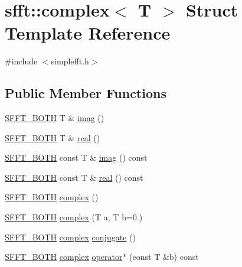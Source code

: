 \hypertarget{structsfft_1_1complex}{}\section{sfft\+:\+:complex$<$ T $>$ Struct Template Reference}
\label{structsfft_1_1complex}


{\ttfamily \#include $<$simplefft.\+h$>$}

\subsection*{Public Member Functions}
\begin{DoxyCompactItemize}
\item 
\hyperlink{simplefft_8h_acfebaca1d9d8f48864704773594876b7}{S\+F\+F\+T\+\_\+\+B\+O\+TH} T \& \hyperlink{structsfft_1_1complex_a5009deeeef4a74a8f75db6e78d832fcc}{imag} ()
\item 
\hyperlink{simplefft_8h_acfebaca1d9d8f48864704773594876b7}{S\+F\+F\+T\+\_\+\+B\+O\+TH} T \& \hyperlink{structsfft_1_1complex_ab7b8596da4ba20a31758a4c0a103d011}{real} ()
\item 
\hyperlink{simplefft_8h_acfebaca1d9d8f48864704773594876b7}{S\+F\+F\+T\+\_\+\+B\+O\+TH} const T \& \hyperlink{structsfft_1_1complex_a7902faacfb7ac78d69a9ce5859943e01}{imag} () const 
\item 
\hyperlink{simplefft_8h_acfebaca1d9d8f48864704773594876b7}{S\+F\+F\+T\+\_\+\+B\+O\+TH} const T \& \hyperlink{structsfft_1_1complex_a2a5ad98469d109a88b115419dab31ef6}{real} () const 
\item 
\hyperlink{simplefft_8h_acfebaca1d9d8f48864704773594876b7}{S\+F\+F\+T\+\_\+\+B\+O\+TH} \hyperlink{structsfft_1_1complex_a5e2144a0d2a2723cbfa187c6e2371d77}{complex} ()
\item 
\hyperlink{simplefft_8h_acfebaca1d9d8f48864704773594876b7}{S\+F\+F\+T\+\_\+\+B\+O\+TH} \hyperlink{structsfft_1_1complex_ac01adbfd40a3b613df13daaac0710aec}{complex} (T a, T b=0.)
\item 
\hyperlink{simplefft_8h_acfebaca1d9d8f48864704773594876b7}{S\+F\+F\+T\+\_\+\+B\+O\+TH} \hyperlink{structsfft_1_1complex}{complex} \hyperlink{structsfft_1_1complex_a3913662ea68490650bb3c076853d6928}{conjugate} ()
\item 
\hyperlink{simplefft_8h_acfebaca1d9d8f48864704773594876b7}{S\+F\+F\+T\+\_\+\+B\+O\+TH} \hyperlink{structsfft_1_1complex}{complex} \hyperlink{structsfft_1_1complex_a87df52644b5b53af4d2e65f5bd528fe3}{operator$\ast$} (const T \&b) const 

\end{DoxyCompactItemize}
